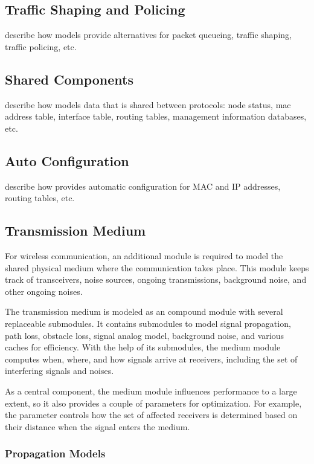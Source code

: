 %
\subsection{Traffic Shaping and Policing}
%
describe how \inet models provide alternatives for packet queueing, traffic shaping, traffic policing, etc.

%
\subsection{Shared Components} %
%
describe how \inet models data that is shared between protocols: node status, mac address table, interface table, routing tables, management information databases, etc.

%
\subsection{Auto Configuration}
%
describe how \inet provides automatic configuration for MAC and IP addresses, routing tables, etc.

%
\subsection{Transmission Medium}
\label{subsec:transmission-medium}

For wireless communication, an additional module is required to model the shared physical medium where the communication takes place. This module keeps track of transceivers, noise sources, ongoing transmissions, background noise, and other ongoing noises.

The transmission medium is modeled as an \omnet compound module with several replaceable submodules. It contains submodules to model signal propagation, path loss, obstacle loss, signal analog model, background noise, and various caches for efficiency. With the help of its submodules, the medium module computes when, where, and how signals arrive at receivers, including the set of interfering signals and noises.

As a central component, the medium module influences performance to a large extent, so it also provides a couple of parameters for optimization. For example, the  parameter controls how the set of affected receivers is determined based on their distance when the signal enters the medium.

\subsubsection*{Propagation Models}

